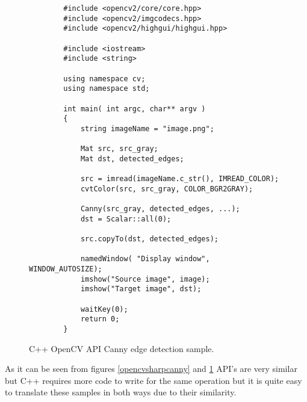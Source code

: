 \documentclass[../../../../main]{subfiles}
\begin{document}
\begin{figure} [!ht]
  \centering    
    \lstset{style=cplusplus}
        \begin{lstlisting}
        #include <opencv2/core/core.hpp>
        #include <opencv2/imgcodecs.hpp>
        #include <opencv2/highgui/highgui.hpp>
        
        #include <iostream>
        #include <string>
        
        using namespace cv;
        using namespace std;
        
        int main( int argc, char** argv )
        {
            string imageName = "image.png";
        
            Mat src, src_gray;
            Mat dst, detected_edges;
            
            src = imread(imageName.c_str(), IMREAD_COLOR);
            cvtColor(src, src_gray, COLOR_BGR2GRAY);
        
            Canny(src_gray, detected_edges, ...);
            dst = Scalar::all(0);
        
            src.copyTo(dst, detected_edges);
        
            namedWindow( "Display window", WINDOW_AUTOSIZE); 
            imshow("Source image", image);                
            imshow("Target image", dst);
        
            waitKey(0);
            return 0;
        }
        \end{lstlisting}
  \caption{C++ OpenCV API Canny edge detection sample.}
  \label{cpluspluscanny}
\end{figure}

As it can be seen from figures \ref{opencvsharpcanny} and \ref{cpluspluscanny} \ac{API}'s are very similar but C++ requires more code to write for the same operation but it is quite easy to translate these samples in both ways due to their similarity.
\end{document}
